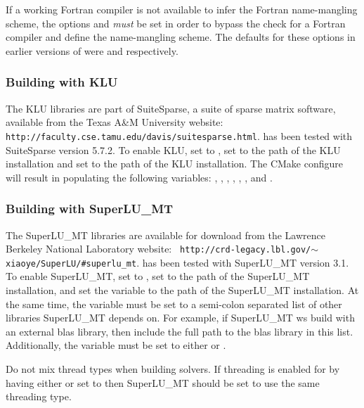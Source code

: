 If a working Fortran compiler is not available to infer the Fortran
name-mangling scheme, the options  and
 \textit{must} be set in order to
bypass the check for a Fortran compiler and define the name-mangling
scheme. The defaults for these options in earlier versions of
{\sundials} were  and  respectively.

\subsubsection*{Building with KLU}
The KLU libraries are part of SuiteSparse, a suite of sparse matrix software,
available from the Texas A\&M University website: {\tt
http://faculty.cse.tamu.edu/davis/suitesparse.html}.  {\sundials} has been
tested with SuiteSparse version 5.7.2.  To enable KLU, set  to
, set  to the  path of the KLU
installation and set  to the  path of the KLU
installation.  The CMake configure will result in populating the following
variables: , , ,
, , , and
\newline{}.

\subsubsection*{Building with SuperLU\_MT}
The SuperLU\_MT libraries are available for download from the Lawrence Berkeley
National Laboratory website: {\tt
http://crd-legacy.lbl.gov/$\sim$xiaoye/SuperLU/\#superlu\_mt}.  {\sundials} has
been tested with SuperLU\_MT version 3.1.  To enable SuperLU\_MT, set
 to , set  to the
 path of the SuperLU\_MT installation, and set the variable
\newline{} to the  path of the SuperLU\_MT
installation.  At the same time, the variable  must be
set to a semi-colon separated list of other libraries SuperLU\_MT depends on.
For example, if SuperLU\_MT ws build with an external blas library, then include
the full path to the blas library in this list. Additionally, the variable
 must be set to either  or
\id{{\openmp}}.

\noindent Do not mix thread types when building {\sundials} solvers.  If
threading is enabled for {\sundials} by having either  or
 set to  then SuperLU\_MT should be set to use the
same threading type.{\warn}

